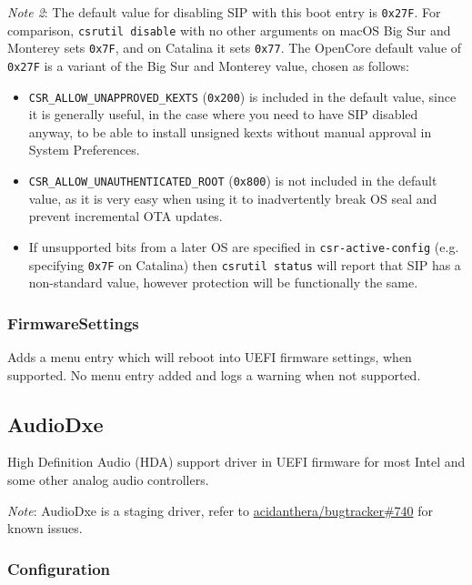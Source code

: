 \documentclass[]{article}
\providecommand{\tightlist}{%
  \setlength{\itemsep}{0pt}\setlength{\parskip}{0pt}}
\begin{document}
\emph{Note 2}: The default value for disabling SIP with this boot entry is \texttt{0x27F}.
For comparison, \texttt{csrutil disable} with no other arguments on macOS Big Sur and Monterey
sets \texttt{0x7F}, and on Catalina it sets \texttt{0x77}. The OpenCore default value of \texttt{0x27F}
is a variant of the Big Sur and Monterey value, chosen as follows:
\begin{itemize}
\tightlist
\item \texttt{CSR\_ALLOW\_UNAPPROVED\_KEXTS} (\texttt{0x200}) is included in the default value,
since it is generally useful, in the case where you need to have SIP disabled anyway, to be
able to install unsigned kexts without manual approval in System Preferences.
\item \texttt{CSR\_ALLOW\_UNAUTHENTICATED\_ROOT} (\texttt{0x800}) is not included in the default
value, as it is very easy when using it to inadvertently break OS seal and prevent incremental OTA updates.
\item If unsupported bits from a later OS are specified in \texttt{csr-active-config}
(e.g. specifying \texttt{0x7F} on Catalina) then \texttt{csrutil status}
will report that SIP has a non-standard value, however protection will be functionally the same.
\end{itemize}

\subsubsection{FirmwareSettings}\label{firmwaresettings}

Adds a menu entry which will reboot into UEFI firmware settings, when supported.
No menu entry added and logs a warning when not supported.

\subsection{AudioDxe}\label{uefiaudio}

High Definition Audio (HDA) support driver in UEFI firmware for most Intel and some other analog audio controllers.

\emph{Note}: AudioDxe is a staging driver, refer to \href{https://github.com/acidanthera/bugtracker/issues/740}{acidanthera/bugtracker\#740}
for known issues.

\subsubsection{Configuration}
\end{document}
